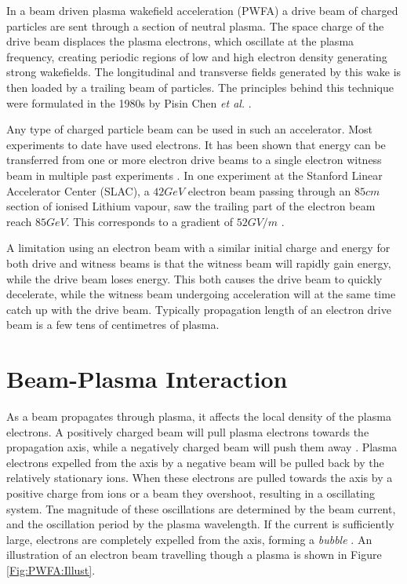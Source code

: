 In a beam driven plasma wakefield acceleration (PWFA) a drive beam of charged particles are sent through a section of neutral plasma. The space charge of the drive beam displaces the plasma electrons, which oscillate at the plasma frequency, creating periodic regions of low and high electron density generating strong wakefields. The longitudinal and transverse fields generated by this wake is then loaded by a trailing beam of particles. The principles behind this technique were formulated in the 1980s by Pisin Chen \emph{et al.} \cite{chen:1985}.

Any type of charged particle beam can be used in such an accelerator. Most experiments to date have used electrons. It has been shown that energy can be transferred from one or more electron drive beams to a single electron witness beam in multiple past experiments \cite{rosenzweig:1988, blumenfeld:2007, kallos:2008, litos:2014}. In one experiment at the Stanford Linear Accelerator Center (SLAC), a $42\unit{GeV}$ electron beam passing through an $85\unit{cm}$ section of ionised Lithium vapour, saw the trailing part of the electron beam reach $85\unit{GeV}$. This corresponds to a gradient of $52\unit{GV/m}$ \cite{blumenfeld:2007}.

A limitation using an electron beam with a similar initial charge and energy for both drive and witness beams is that the witness beam will rapidly gain energy, while the drive beam loses energy. This both causes the drive beam to quickly decelerate, while the witness beam undergoing acceleration will at the same time catch up with the drive beam. Typically propagation length of an electron drive beam is a few tens of centimetres of plasma.

\section{Beam-Plasma Interaction}
\label{Int:BPI}

As a beam propagates through plasma, it affects the local density of the plasma electrons. A positively charged beam will pull plasma electrons towards the propagation axis, while a negatively charged beam will push them away \cite{lee:2001,adli:2016b}. Plasma electrons expelled from the axis by a negative beam will be pulled back by the relatively stationary ions. When these electrons are pulled towards the axis by a positive charge from ions or a beam they overshoot, resulting in a oscillating system. Tne magnitude of these oscillations are determined by the beam current, and the oscillation period by the plasma wavelength. If the current is sufficiently large, electrons are completely expelled from the axis, forming a \textit{bubble} \cite{hogan:2016,muggli:2017}. An illustration of an electron beam travelling though a plasma is shown in Figure \ref{Fig:PWFA:Illust}.

